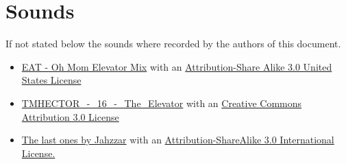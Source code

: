 \documentclass[12pt]{article}
\begin{document}
\section{Sounds}
If not stated below the sounds where recorded by the authors of this document.
\begin{itemize}
\item \href{http://freemusicarchive.org/music/EAT/20100129104001364/Oh_Mom_Elevator_Mix}{EAT - Oh Mom Elevator Mix} with an \href{http://creativecommons.org/licenses/by-sa/3.0/us/}{Attribution-Share Alike 3.0 United States License}
\item \href{http://freemusicarchive.org/music/TMHECTOR/The_Haunted_Mansion/DS10Forumcom\_-\_DS10Forumcom\_-\_The_Haunted_Mansion\_-\_16\_The\_Elevator}{TMHECTOR\_-\_16\_-\_The\_Elevator} with an \href{http://creativecommons.org/licenses/by/3.0/}{Creative Commons Attribution 3.0 License}
\item \href{http://freemusicarchive.org/music/Jahzzar/Smoke_Factory/The_last_ones}{The last ones by Jahzzar} with an \href{http://creativecommons.org/licenses/by-sa/3.0/}{Attribution-ShareAlike 3.0 International License.}
\end{itemize}



\end{document}

